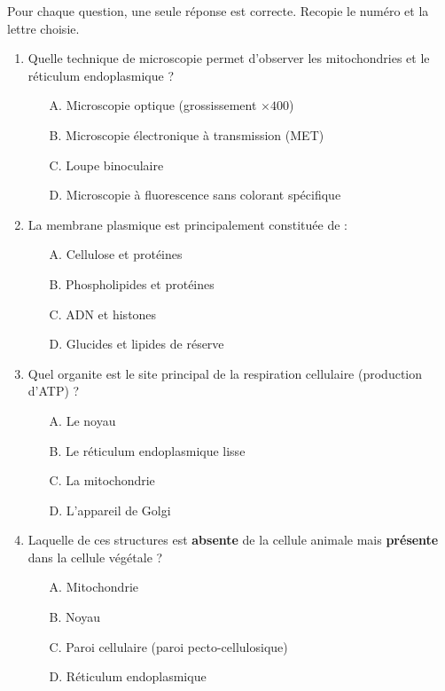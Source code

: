 \documentclass[11pt]{article}
\begin{document}
\begin{exercice}
Pour chaque question, une seule réponse est correcte. Recopie le numéro et la lettre choisie.
\begin{enumerate}
    \item Quelle technique de microscopie permet d'observer les mitochondries et le réticulum endoplasmique ?
    \begin{itemize}
        \item[A.] Microscopie optique (grossissement $\times 400$)
        \item[B.] Microscopie électronique à transmission (MET)
        \item[C.] Loupe binoculaire
        \item[D.] Microscopie à fluorescence sans colorant spécifique
    \end{itemize}
    \item La membrane plasmique est principalement constituée de :
    \begin{itemize}
        \item[A.] Cellulose et protéines
        \item[B.] Phospholipides et protéines
        \item[C.] ADN et histones
        \item[D.] Glucides et lipides de réserve
    \end{itemize}
    \item Quel organite est le site principal de la respiration cellulaire (production d'ATP) ?
    \begin{itemize}
        \item[A.] Le noyau
        \item[B.] Le réticulum endoplasmique lisse
        \item[C.] La mitochondrie
        \item[D.] L'appareil de Golgi
    \end{itemize}
    \item Laquelle de ces structures est \textbf{absente} de la cellule animale mais \textbf{présente} dans la cellule végétale ?
    \begin{itemize}
        \item[A.] Mitochondrie
        \item[B.] Noyau
        \item[C.] Paroi cellulaire (paroi pecto-cellulosique)
        \item[D.] Réticulum endoplasmique
    \end{itemize}
\end{enumerate}
\end{exercice}
\end{document}
